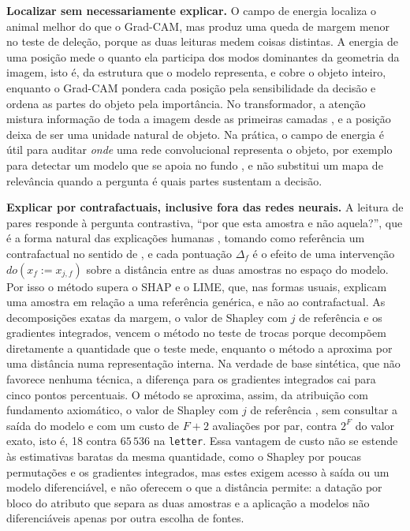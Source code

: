 \textbf{Localizar sem necessariamente explicar.} O campo de energia localiza o animal melhor do que o Grad-CAM, mas produz uma queda de margem menor no teste de deleção, porque as duas leituras medem coisas distintas. A energia de uma posição mede o quanto ela participa dos modos dominantes da geometria da imagem, isto é, da estrutura que o modelo representa, e cobre o objeto inteiro, enquanto o Grad-CAM pondera cada posição pela sensibilidade da decisão e ordena as partes do objeto pela importância. No transformador, a atenção mistura informação de toda a imagem desde as primeiras camadas \citep{Raghu2021}, e a posição deixa de ser uma unidade natural de objeto. Na prática, o campo de energia é útil para auditar \textit{onde} uma rede convolucional representa o objeto, por exemplo para detectar um modelo que se apoia no fundo \citep{Geirhos2020}, e não substitui um mapa de relevância quando a pergunta é quais partes sustentam a decisão.

\textbf{Explicar por contrafactuais, inclusive fora das redes neurais.} A leitura de pares responde à pergunta contrastiva, ``por que esta amostra e não aquela?'', que é a forma natural das explicações humanas \citep{Miller2019}, tomando como referência um contrafactual no sentido de \cite{Guidotti2022}, e cada pontuação $\Delta_f$ é o efeito de uma intervenção $do(x_f := x_{j,f})$ sobre a distância entre as duas amostras no espaço do modelo. Por isso o método supera o SHAP e o LIME, que, nas formas usuais, explicam uma amostra em relação a uma referência genérica, e não ao contrafactual. As decomposições exatas da margem, o valor de Shapley com $j$ de referência e os gradientes integrados, vencem o método no teste de trocas porque decompõem diretamente a quantidade que o teste mede, enquanto o método a aproxima por uma distância numa representação interna. Na verdade de base sintética, que não favorece nenhuma técnica, a diferença para os gradientes integrados cai para cinco pontos percentuais. O método se aproxima, assim, da atribuição com fundamento axiomático, o valor de Shapley com $j$ de referência \citep{SundararajanNajmi2020}, sem consultar a saída do modelo e com um custo de $F + 2$ avaliações por par, contra $2^F$ do valor exato, isto é, 18 contra $65\,536$ na \texttt{letter}. Essa vantagem de custo não se estende às estimativas baratas da mesma quantidade, como o Shapley por poucas permutações e os gradientes integrados, mas estes exigem acesso à saída ou um modelo diferenciável, e não oferecem o que a distância permite: a datação por bloco do atributo que separa as duas amostras e a aplicação a modelos não diferenciáveis apenas por outra escolha de fontes.

